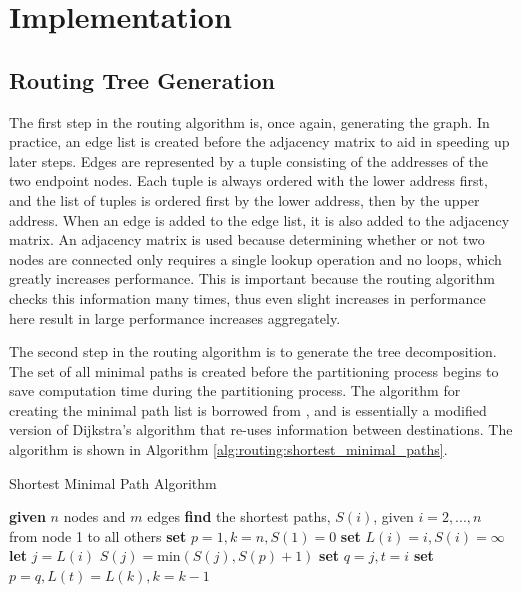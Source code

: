 \section{Implementation}\label{sec:routing:implementation}

\subsection{Routing Tree Generation}\label{sec:routing:implementation:routing_tree_generation}

The first step in the routing algorithm is, once again, generating the graph. In practice, an edge list is created before the adjacency matrix to aid in speeding up later steps. Edges are represented by a tuple consisting of the addresses of the two endpoint nodes. Each tuple is always ordered with the lower address first, and the list of tuples is ordered first by the lower address, then by the upper address. When an edge is added to the edge list, it is also added to the adjacency matrix. An adjacency matrix is used because determining whether or not two nodes are connected only requires a single lookup operation and no loops, which greatly increases performance. This is important because the routing algorithm checks this information many times, thus even slight increases in performance here result in large performance increases aggregately.

The second step in the routing algorithm is to generate the tree decomposition. The set of all minimal paths is created before the partitioning process begins to save computation time during the partitioning process. The algorithm for creating the minimal path list is borrowed from \cite{ref:2007-lau-java_library_of_graph_algorithms}, and is essentially a modified version of Dijkstra's algorithm that re-uses information between destinations. The algorithm is shown in Algorithm \ref{alg:routing:shortest_minimal_paths}.
\begin{algorithm}
	\caption[Shortest Minimal Path]{Shortest Minimal Path Algorithm \cite{ref:2007-lau-java_library_of_graph_algorithms}}
	\begin{algorithmic}[1]
		\STATE \textbf{given} $n$ nodes and $m$ edges
		\STATE \textbf{find} the shortest paths, $S(i)$, given $i=2,...,n $ from node 1 to all others
		\STATE \textbf{set} $p=1, k=n, S(1)=0$
		\REPEAT
			\STATE \textbf{set} $L(i)=i, S(i)=\infty $
		\ENDFOR
			\STATE \textbf{let} $j=L(i)$
			\STATE $S(j)=\textrm{min}\left( S(j),S(p)+1\right) $
				\STATE \textbf{set} $q=j, t=i$
			\ENDIF
		\ENDFOR
		\STATE \textbf{set} $p=q, L(t)=L(k),k=k-1$
	\end{algorithmic}
	\label{alg:routing:shortest_minimal_paths}
\end{algorithm}

